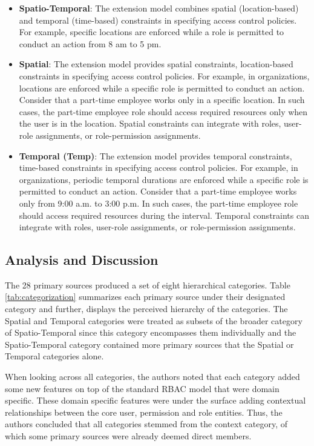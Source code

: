 \begin{itemize}
  \item \textbf{Spatio-Temporal}: The extension model combines spatial (location-based) and temporal (time-based) constraints in specifying access control policies. For example, specific locations are enforced while a role is permitted to conduct an action from 8 am to 5 pm.

  \item \textbf{Spatial}: The extension model provides spatial constraints, location-based constraints in specifying access
	control policies. For example, in organizations, locations are enforced while a
	specific role is permitted to conduct an action. Consider that a part-time employee works only in a specific location.
	In such cases, the part-time employee role should access required resources only when the user is in the location. 
	Spatial constraints can integrate with roles, user-role assignments, or role-permission assignments. 

  \item \textbf{Temporal (Temp)}:  The extension model provides temporal constraints, time-based constraints in specifying access
	control policies. For example, in organizations, periodic temporal durations are enforced while a
	specific role is permitted to conduct an action. Consider that a part-time employee works only from 9:00 a.m. to 3:00 p.m.
	In such cases, the part-time employee role should access required resources during the interval. 
	Temporal constraints can integrate with roles, user-role assignments, or role-permission assignments.   
	
\end{itemize}

\subsection{Analysis and Discussion}

The 28 primary sources produced a set of eight hierarchical categories. Table \ref{tab:categorization} summarizes each primary source under their designated
category and further, displays the perceived hierarchy of the categories. 
The Spatial and Temporal categories were treated as subsets of the broader category of Spatio-Temporal since this category encompasses them individually and
the Spatio-Temporal category contained more primary sources that the Spatial or Temporal categories alone.  

When looking across all categories, the authors noted that each category added some new features on top of the standard RBAC model that were domain specific.
These domain specific features were under the surface adding contextual relationships between the core user, permission and role entities.  Thus, the authors
concluded that all categories stemmed from the context category, of which some primary sources were already deemed direct members.  


